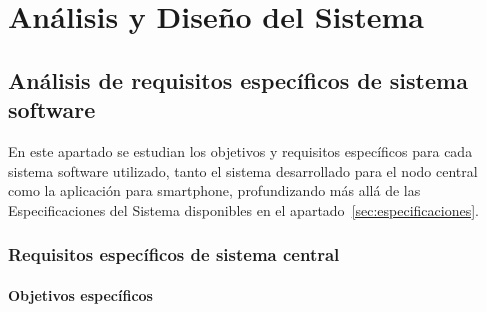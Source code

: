 

\clearpage
\chapter{Análisis y Diseño del Sistema}
\label{sec:analisisdiseno}

    \section{Análisis de requisitos específicos de sistema software}
    
    En este apartado se estudian los objetivos y requisitos específicos para cada sistema software utilizado, tanto el sistema desarrollado para el nodo central como la aplicación para smartphone, profundizando más allá de las Especificaciones del Sistema disponibles en el apartado~\ref{sec:especificaciones}.

        \subsection{Requisitos específicos de sistema central}
        
            \subsubsection{Objetivos específicos}
            
            \begin{table}[!ht]
                \centering
                \caption{Objetivo 1 del nodo central: Utilizar el puente Hue.}
               \label{sys_obj1}
            \end{table}
            
